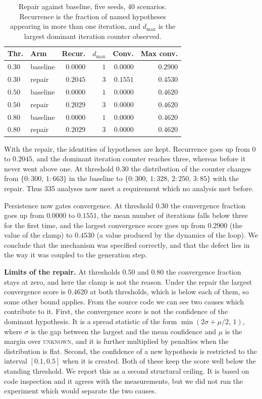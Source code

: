 \documentclass[conference]{IEEEtran}
\begin{document}
\begin{table}[t]
\caption{Repair against baseline, five seeds, 40 scenarios. Recurrence is the
fraction of named hypotheses appearing in more than one iteration, and
$d_{\max}$ is the largest dominant iteration counter observed.}
\label{tab:repair}
\centering
\small
\begin{tabular}{@{}llrrrr@{}}
\toprule
Thr. & Arm & Recur. & $d_{\max}$ & Conv. & Max conv. \\
\midrule
$0.30$ & baseline & $0.0000$ & $1$ & $0.0000$ & $0.2900$ \\
$0.30$ & repair   & $0.2045$ & $3$ & $0.1551$ & $0.4530$ \\
$0.50$ & baseline & $0.0000$ & $1$ & $0.0000$ & $0.4620$ \\
$0.50$ & repair   & $0.2029$ & $3$ & $0.0000$ & $0.4620$ \\
$0.80$ & baseline & $0.0000$ & $1$ & $0.0000$ & $0.4620$ \\
$0.80$ & repair   & $0.2029$ & $3$ & $0.0000$ & $0.4620$ \\
\bottomrule
\end{tabular}
\end{table}

With the repair, the identities of hypotheses are kept. Recurrence goes up from
$0$ to $0.2045$, and the dominant iteration counter reaches three, whereas
before it never went above one. At threshold $0.30$ the distribution of the
counter changes from $\{0{:}300,\,1{:}663\}$ in the baseline to
$\{0{:}300,\,1{:}328,\,2{:}250,\,3{:}85\}$ with the repair. Thus 335 analyses
now meet a requirement which no analysis met before.

Persistence now gates convergence. At threshold $0.30$ the convergence
fraction goes up from $0.0000$ to $0.1551$, the mean number of iterations falls
below three for the first time, and the largest convergence score goes up from
$0.2900$ (the value of the clamp) to $0.4530$ (a value produced by the dynamics
of the loop). We conclude that the mechanism was specified correctly, and that
the defect lies in the way it was coupled to the generation step.

\textbf{Limits of the repair.}
At thresholds $0.50$ and $0.80$ the convergence fraction stays at zero, and
here the clamp is not the reason. Under the repair the largest convergence
score is $0.4620$ at both thresholds, which is below each of them, so some
other bound applies. From the source code we can see two causes which
contribute to it. First, the convergence score is not the confidence of the
dominant hypothesis. It is a spread statistic of the form
$\min(2\sigma + \mu/2,\, 1)$, where $\sigma$ is the gap between the largest
and the mean confidence and $\mu$ is the margin over \textsc{unknown}, and it
is further multiplied by penalties when the distribution is flat. Second, the
confidence of a new hypothesis is restricted to the interval $[0.1, 0.5]$ when
it is created. Both of these keep the score well below the standing threshold.
We report this as a second structural ceiling. It is based on code inspection
and it agrees with the measurements, but we did not run the experiment which
would separate the two causes.
\end{document}
